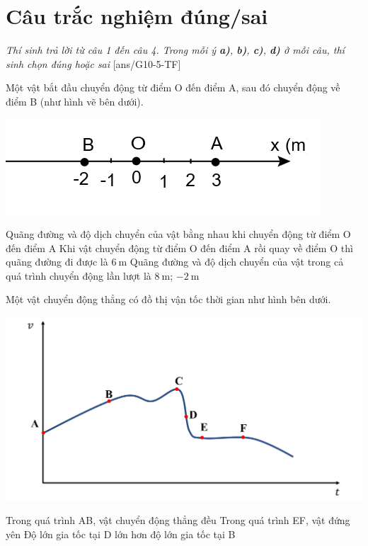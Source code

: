 \section{Câu trắc nghiệm đúng/sai} 
\textit{Thí sinh trả lời từ câu 1 đến câu 4. Trong mỗi ý \textbf{a)}, \textbf{b)}, \textbf{c)}, \textbf{d)} ở mỗi câu, thí sinh chọn đúng hoặc sai}
\setcounter{ex}{0}
[ans/G10-5-TF]
\begin{ex}
	Một vật bắt đầu chuyển động từ điểm O đến điểm A, sau đó chuyển động về điểm B (như hình vẽ bên dưới).
	\begin{center}
		\includegraphics[width=0.4\linewidth]{../figs/D10-2-7}
	\end{center}
	{\True Quãng đường và độ dịch chuyển của vật bằng nhau khi chuyển động từ điểm O đến điểm A}
	{\True Khi vật chuyển động từ điểm O đến điểm A rồi quay về điểm O thì quãng đường đi được là $\SI{6}{\meter}$}
	{\True Quãng đường và độ dịch chuyển của vật trong cả quá trình chuyển động lần lượt là $\SI{8}{\meter}$; $\SI{-2}{\meter}$}
	\loigiai{}
\end{ex}
\begin{ex}
	Một vật chuyển động thẳng có đồ thị vận tốc thời gian như hình bên dưới.
	\begin{center}
		\includegraphics[width=0.7\linewidth]{../figs/D10-2-8}
	\end{center}
	{Trong quá trình AB, vật chuyển động thẳng đều}
	{Trong quá trình EF, vật đứng yên}
	{\True Độ lớn gia tốc tại D lớn hơn độ lớn gia tốc tại B}
	\loigiai{}
\end{ex}
